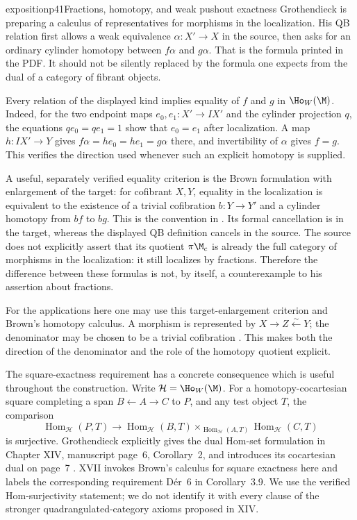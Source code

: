 \begin{dcomment}{exposition}{p41}{Fractions, homotopy, and weak pushout exactness}
Grothendieck is preparing a calculus of representatives for morphisms in the localization. His QB relation first allows a weak equivalence $\alpha:X'\to X$ in the source, then asks for an ordinary cylinder homotopy between $f\alpha$ and $g\alpha$. That is the formula printed in the PDF. It should not be silently replaced by the formula one expects from the dual of a category of fibrant objects.

Every relation of the displayed kind implies equality of $f$ and $g$ in $\Ho_W(\M)$. Indeed, for the two endpoint maps $e_0,e_1:X'\to IX'$ and the cylinder projection $q$, the equations $qe_0=qe_1=1$ show that $e_0=e_1$ after localization. A map $h:IX'\to Y$ gives $f\alpha=he_0=he_1=g\alpha$ there, and invertibility of $\alpha$ gives $f=g$. This verifies the direction used whenever such an explicit homotopy is supplied.

A useful, separately verified equality criterion is the Brown formulation with enlargement of the target: for cofibrant $X,Y$, equality in the localization is equivalent to the existence of a trivial cofibration $b:Y\to Y'$ and a cylinder homotopy from $bf$ to $bg$. This is the convention in \citet[Section 6.3, diagram (6.1), and Theorem 6.3.1]{RadulescuBanu2009}. Its formal cancellation is in the target, whereas the displayed QB definition cancels in the source. The source does not explicitly assert that its quotient $\pi\M_c$ is already the full category of morphisms in the localization: it still localizes by fractions. Therefore the difference between these formulas is not, by itself, a counterexample to his assertion about fractions.

For the applications here one may use this target-enlargement criterion and Brown's homotopy calculus. A morphism is represented by $X\to Z\xleftarrow{\sim}Y$; the denominator may be chosen to be a trivial cofibration \citep[Theorem 6.4.5(1)(a)]{RadulescuBanu2009}. This makes both the direction of the denominator and the role of the homotopy quotient explicit.

The square-exactness requirement has a concrete consequence which is useful throughout the construction. Write $\mathcal H=\Ho_W(\M)$. For a homotopy-cocartesian square completing a span $B\leftarrow A\to C$ to $P$, and any test object $T$, the comparison
\[
 \operatorname{Hom}_{\mathcal H}(P,T)\longrightarrow
 \operatorname{Hom}_{\mathcal H}(B,T)
 \times_{\operatorname{Hom}_{\mathcal H}(A,T)}
 \operatorname{Hom}_{\mathcal H}(C,T)
\]
is surjective. Grothendieck explicitly gives the dual Hom-set formulation in Chapter XIV, manuscript page~6, Corollary~2, and introduces its cocartesian dual on page~7 \citep{GrothendieckDerivateursXIV}. XVII invokes Brown's calculus for square exactness here and labels the corresponding requirement D\'er~6 in Corollary~3.9. We use the verified Hom-surjectivity statement; we do not identify it with every clause of the stronger quadrangulated-category axioms proposed in XIV.


\end{dcomment}
